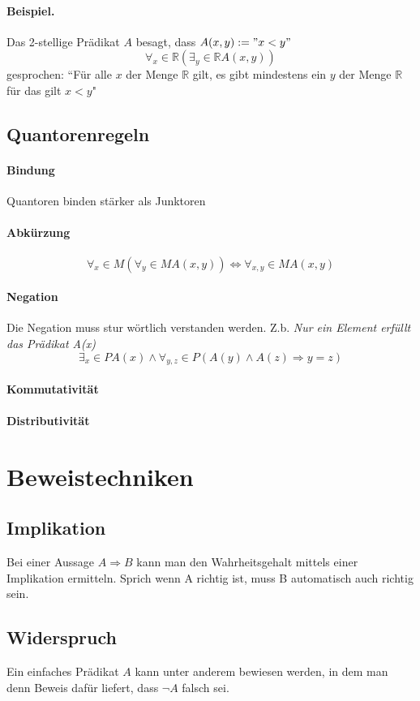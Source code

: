 \documentclass{article}
\begin{document}
\paragraph{Beispiel.} Das 2-stellige Prädikat \(A\) besagt, dass \(A(x,y) := "x<y"\)
\[
		\forall_x \in \mathbb{R} (\exists_y \in \mathbb{R} A(x,y))
\]
gesprochen: ``Für alle \(x\) der Menge \( \mathbb{R}\) gilt, es gibt mindestens ein \(y\) der Menge \( \mathbb{R}\) für das gilt \(x<y\)"
\subsection{Quantorenregeln}
\paragraph{Bindung} 
Quantoren binden stärker als Junktoren
\paragraph{Abkürzung}
\[
		\forall_x \in M (\forall_y \in M A(x,y)) \Leftrightarrow \forall_{x,y} \in M A(x,y)
\]
\paragraph{Negation}
Die Negation muss stur wörtlich verstanden werden. Z.b. \textit{Nur ein Element erfüllt das Prädikat A(x)} \[
		\exists_x \in P A(x) \wedge \forall_{y,z} \in P (A(y) \wedge A(z) \Rightarrow y=z)
\]
\paragraph{Kommutativität}

\paragraph{Distributivität}
\newpage

\section{Beweistechniken}
\subsection{Implikation}
Bei einer Aussage \(A \Rightarrow B\) kann man den Wahrheitsgehalt mittels einer Implikation ermitteln. Sprich wenn A richtig ist, muss B automatisch auch richtig sein.
\subsection{Widerspruch}
Ein einfaches Prädikat \(A\) kann unter anderem bewiesen werden, in dem man denn Beweis dafür liefert, dass \(\neg A \) falsch sei.
\end{document}
